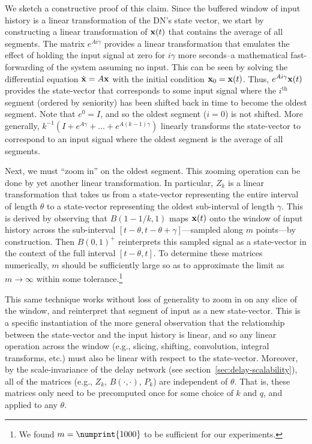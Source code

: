 We sketch a constructive proof of this claim.
Since the buffered window of input history is a linear transformation of the DN's state vector, we start by constructing a linear transformation of $\mathbf{x}(t)$ that contains the average of all segments. 
The matrix $e^{A i \gamma}$ provides a linear transformation that emulates the effect of holding the input signal at zero for $i \gamma$ more seconds--a mathematical fast-forwarding of the system assuming no input.
This can be seen by solving the differential equation $\dot{\mathbf{x}} = A \mathbf{x}$ with the initial condition $\mathbf{x}_0 = \mathbf{x}(t)$.
Thus, $e^{A i \gamma} \mathbf{x}(t)$ provides the state-vector that corresponds to some input signal where the $i^\text{th}$ segment (ordered by seniority) has been shifted back in time to become the oldest segment. 
Note that $e^0 = I$, and so the oldest segment ($i=0$) is not shifted.
More generally, $k^{-1} \left( I + e^{A \gamma} + \ldots + e^{A (k-1) \gamma} \right)$ linearly transforms the state-vector to correspond to an input signal where the oldest segment is the average of all segments.

Next, we must ``zoom in'' on the oldest segment.  
This zooming operation can be done by yet another linear transformation.
In particular, $Z_k$ is a linear transformation that takes us from a state-vector representing the entire interval of length $\theta$ to a state-vector representing the oldest sub-interval of length $\gamma$.
This is derived by observing that $B(1 - 1/k, 1)$ maps $\mathbf{x}(t)$ onto the window of input history across the sub-interval $[t - \theta, t - \theta + \gamma]$---sampled along $m$ points---by construction.
Then $B(0, 1)^+$ reinterprets this sampled signal as a state-vector in the context of the full interval $[t - \theta, t]$.
To determine these matrices numerically, $m$ should be sufficiently large so as to approximate the limit as $m \rightarrow \infty$ within some tolerance.\footnote{%
We found $m = \numprint{1000}$ to be sufficient for our experiments.}

This same technique works without loss of generality to zoom in on any slice of the window, and reinterpret that segment of input as a new state-vector. This is a specific instantiation of the more general observation that the relationship between the state-vector and the input history is linear, and so any linear operation across the window (e.g., slicing, shifting, convolution, integral transforms, etc.) must also be linear with respect to the state-vector.
Moreover, by the scale-invariance of the delay network (see section~\ref{sec:delay-scalability}), all of the matrices (e.g., $Z_k$, $B(\cdot, \cdot)$, $P_k$) are independent of $\theta$. That is, these matrices only need to be precomputed once for some choice of $k$ and $q$, and applied to any $\theta$.

